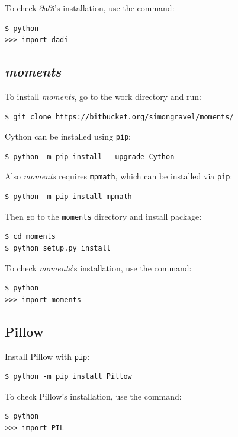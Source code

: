 \documentclass[12pt]{article}
\makeatletter
\newcommand{\dadi}{$\partial$a$\partial$i\xspace}
\newcommand{\moments}{\textit{moments}\xspace}
\newcommand{\py}[1]{\lstinline[language=Python, showstringspaces=False]@#1@}
\makeatother
\begin{document}
To check \dadi's installation, use the command:

\begin{lstlisting}
$ python
>>> import dadi
\end{lstlisting}

\subsection{\moments}

To install \moments, go to the work directory and run:

\begin{lstlisting}
$ git clone https://bitbucket.org/simongravel/moments/
\end{lstlisting}

Cython can be installed using \py{pip}:
\begin{lstlisting}
$ python -m pip install --upgrade Cython
\end{lstlisting}

Also \moments requires \py{mpmath}, which can be installed via \py{pip}:
\begin{lstlisting}
$ python -m pip install mpmath
\end{lstlisting}

Then go to the \py{moments} directory and install package:

\begin{lstlisting}
$ cd moments
$ python setup.py install
\end{lstlisting}

To check \moments's installation, use the command:

\begin{lstlisting}
$ python
>>> import moments
\end{lstlisting}

\subsection{Pillow}

Install Pillow with \py{pip}:

\begin{lstlisting}
$ python -m pip install Pillow
\end{lstlisting}

To check Pillow's installation, use the command:

\begin{lstlisting}
$ python
>>> import PIL
\end{lstlisting}
\end{document}
